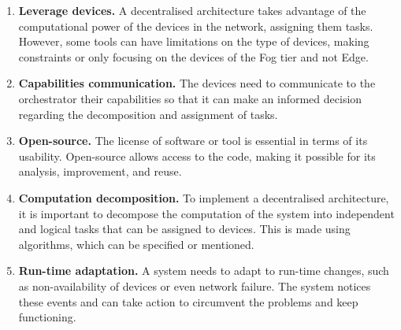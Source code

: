 \begin{enumerate}
    \item\textbf{Leverage devices.} A decentralised architecture takes advantage of the computational power of the devices in the network, assigning them tasks. However, some tools can have limitations on the type of devices, making constraints or only focusing on the devices of the Fog tier and not Edge.
    \item\textbf{Capabilities communication.} The devices need to communicate to the orchestrator their capabilities so that it can make an informed decision regarding the decomposition and assignment of tasks.
    \item\textbf{Open-source.} The license of software or tool is essential in terms of its usability. Open-source allows access to the code, making it possible for its analysis, improvement, and reuse.
    \item\textbf{Computation decomposition.} To implement a decentralised architecture, it is important to decompose the computation of the system into independent and logical tasks that can be assigned to devices. This is made using algorithms, which can be specified or mentioned.
    \item\textbf{Run-time adaptation.} A system needs to adapt to run-time changes, such as non-availability of devices or even network failure. The system notices these events and can take action to circumvent the problems and keep functioning.
\end{enumerate}

